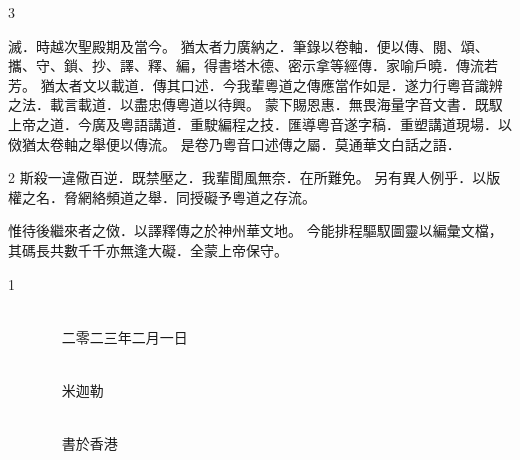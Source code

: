 \documentclass{book}
\begin{document}
\begin{sloppypar}
\begin{paracol}{3}
\switchcolumn

\fontsize{11}{13}\rightfont \Large 滅．時越次聖殿期及當今。 \rightfont 猶太者力廣納之．筆錄以卷軸．便以傳、閱、頌、攜、守、鎖、抄、譯、釋、編，得書塔木德、密示拿等經傳．家喻戶曉．傳流若芳。 \rightfont 猶太者文以載道．傳其口述．今我輩粵道之傳應當作如是．遂力行粵音識辨之法．載言載道．以盡忠傳粵道以待興。 \rightfont 蒙下賜恩惠．無畏海量字音文書．既馭上帝之道．今廣及粵語講道．重駛編程之技．匯導粵音遂字稿．重塑講道現場．以傚猶太卷軸之舉便以傳流。 \rightfont 是卷乃粵音口述傳之屬．莫通華文白話之語．

\end{paracol}

\begin{paracol}{2}\fontsize{11}{13}\leftfont \Large {} \leftfont 斯殺一違儆百逆．既禁壓之．我輩聞風無奈．在所難免。 \leftfont 另有異人例乎．以版權之名．脅網絡頻道之舉．同授礙予粵道之存流。

\switchcolumn

\fontsize{11}{13}\rightfont \Large 惟待後繼來者之傚．以譯釋傳之於神州華文地。 \rightfont 今能排程驅馭圖靈以編彙文檔，其碼長共數千千亦無逢大礙．全蒙上帝保守。

\end{paracol}



\begin{paracol}{1}

\fontsize{11}{13}\rightfont \Large
~~~~~~~~~~~~~~~~~~~~~~~~~~~~~~~~~~~~~~~~~~~~~~~~~~~~~~~~~~~~~~~~~~~~~~~~~~~~~~~ \rightfont 二零二三年二月一日

~~~~~~~~~~~~~~~~~~~~~~~~~~~~~~~~~~~~~~~~~~~~~~~~~~~~~~~~~~~~~~~~~~~~~~~~~~~~~~~ \rightfont 米迦勒

~~~~~~~~~~~~~~~~~~~~~~~~~~~~~~~~~~~~~~~~~~~~~~~~~~~~~~~~~~~~~~~~~~~~~~~~~~~~~~~ \rightfont 書於香港

\end{paracol}

\end{sloppypar}
\end{document}
